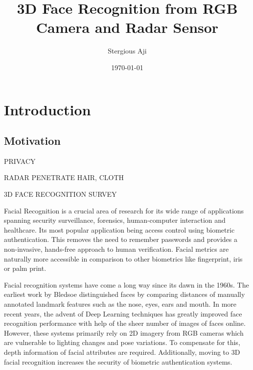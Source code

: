 \documentclass{interim}
\begin{document}
\title{3D Face Recognition from RGB Camera and Radar Sensor}
\author{Stergious Aji}
\date{\today}
\maketitle

{\hypersetup{hidelinks}\tableofcontents}
\newpage

\section{Introduction}\label{intro}

\subsection{Motivation}
PRIVACY

RADAR PENETRATE HAIR, CLOTH \cite{vizard2006advances}

3D FACE RECOGNITION SURVEY \cite{zhou20183d}

Facial Recognition is a crucial area of research for its wide range of applications spanning security surveillance, forensics, human-computer interaction and healthcare. Its most popular application being access control using biometric authentication. This removes the need to remember passwords and provides a non-invasive, hands-free approach to human verification. Facial metrics are naturally more accessible in comparison to other biometrics like fingerprint, iris or palm print.

Facial recognition systems have come a long way since its dawn in the 1960s. The earliest work by Bledsoe \cite{bledsoe1966model} distinguished faces by comparing distances of manually annotated landmark features such as the nose, eyes, ears and mouth. In more recent years, the advent of Deep Learning techniques has greatly improved face recognition performance with help of the sheer number of images of faces online. However, these systems primarily rely on 2D imagery from RGB cameras which are vulnerable to lighting changes and pose variations. To compensate for this, depth information of facial attributes are required. Additionally, moving to 3D facial recognition increases the security of biometric authentication systems.
\end{document}
